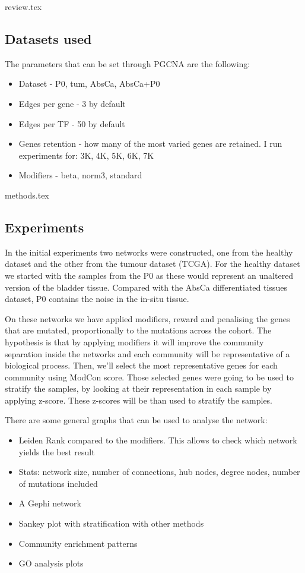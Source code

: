 {review.tex}


\subsection{Datasets used}


The parameters that can be set through PGCNA are the following:
\begin{itemize}
    \item Dataset - P0, tum, AbsCa, AbsCa+P0
    \item Edges per gene - 3 by default
    \item Edges per TF - 50 by default
    \item Genes retention - how many of the most varied genes are retained. I run experiments for: 3K, 4K, 5K, 6K, 7K
    \item Modifiers - beta, norm3, standard
\end{itemize}


{methods.tex}

\subsection{Experiments}


In the initial experiments two networks were constructed, one from the healthy dataset and the other from the tumour dataset (TCGA). For the healthy dataset we started with the samples from the P0 as these would represent an unaltered version of the bladder tissue. Compared with the AbsCa differentiated tissues dataset, P0 contains the noise in the in-situ tissue.

On these networks we have applied modifiers, reward and penalising the genes that are mutated, proportionally to the mutations across the cohort. The hypothesis is that by applying modifiers it will improve the community separation inside the networks and each community will be representative of a biological process. Then, we'll select the most representative genes for each community using ModCon score. Those selected genes were going to be used to stratify the samples, by looking at their representation in each sample by applying z-score. These z-scores will be than used to stratify the samples.


There are some general graphs that can be used to analyse the network:
\begin{itemize}
    \item Leiden Rank compared to the modifiers. This allows to check which network yields the best result
    \item Stats: network size, number of connections, hub nodes, degree nodes, number of mutations included
    \item A Gephi network
    \item Sankey plot with stratification with other methods
    \item Community enrichment patterns
    \item GO analysis plots
\end{itemize}


